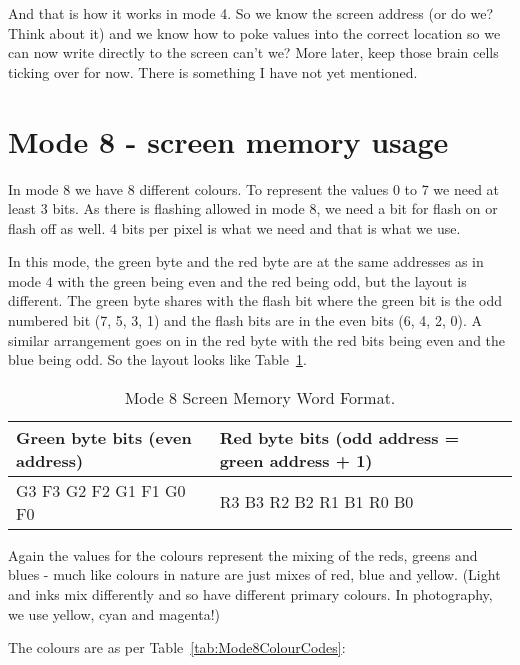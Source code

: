 And that is how it works in mode 4. So we know the screen address
    (or do we? Think about it) and we know how to poke values into the correct
    location so we can now write directly to the screen can't we? More later,
    keep those brain cells ticking over for now. There is something I have not
    yet mentioned.

\section{Mode 8 -{} screen memory usage}
\label{ch8-mode-8}%

In mode 8 we have 8 different colours. To represent the values 0 to
    7 we need at least 3 bits. As there is flashing allowed in mode 8, we need
    a bit for flash on or flash off as well. 4 bits per pixel is what we need
    and that is what we use.

In this mode, the green byte and the red byte are at the same
    addresses as in mode 4 with the green being even and the red being odd,
    but the layout is different. The green byte shares with the flash bit
    where the green bit is the odd numbered bit (7, 5, 3, 1) and the flash
    bits are in the even bits (6, 4, 2, 0). A similar arrangement goes on in
    the red byte with the red bits being even and the blue being odd. So the
    layout looks like Table~\ref{tab:Mode8ScreenMemoryWordFormat}.

\begin{table}[htbp]
\centering
\begin{tabular}{l l}
\toprule
\textbf{Green byte bits (even address)} & \textbf{Red byte bits (odd address = green address + 1)}  \\
\midrule
%
G3 F3 G2 F2 G1 F1 G0 F0 & R3 B3 R2 B2 R1 B1 R0 B0 \\
%
\bottomrule
\end{tabular}
\caption{Mode 8 Screen Memory Word Format.}
\label{tab:Mode8ScreenMemoryWordFormat}
\end{table}

Again the values for the colours represent the mixing of the reds,
    greens and blues -{} much like colours in nature are just mixes of red, blue
    and yellow. (Light and inks mix differently and so have different primary
    colours. In photography, we use yellow, cyan and magenta!)

The colours are as per Table~\ref{tab:Mode8ColourCodes}:

